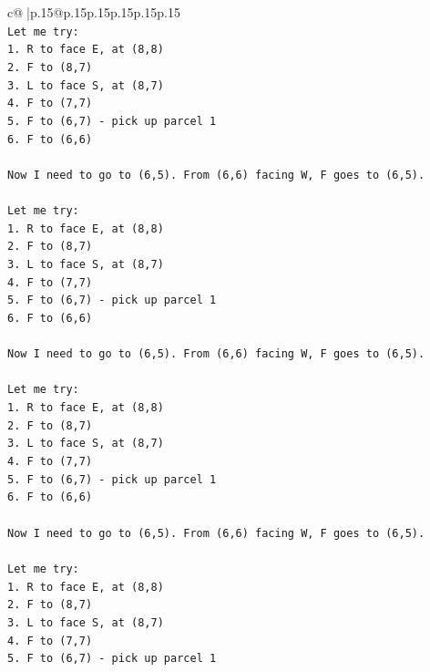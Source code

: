 \documentclass{article}
\begin{document}
{\begin{supertabular}{c@{$\;$}|p{.15\linewidth}@{}p{.15\linewidth}p{.15\linewidth}p{.15\linewidth}p{.15\linewidth}p{.15\linewidth}}
{{{\\ 
\texttt{Let me try:} \\
\texttt{1. R to face E, at (8,8)} \\
\texttt{2. F to (8,7)} \\
\texttt{3. L to face S, at (8,7)} \\
\texttt{4. F to (7,7)} \\
\texttt{5. F to (6,7) {-} pick up parcel 1} \\
\texttt{6. F to (6,6)} \\
\\ 
\texttt{Now I need to go to (6,5). From (6,6) facing W, F goes to (6,5).} \\
\\ 
\texttt{Let me try:} \\
\texttt{1. R to face E, at (8,8)} \\
\texttt{2. F to (8,7)} \\
\texttt{3. L to face S, at (8,7)} \\
\texttt{4. F to (7,7)} \\
\texttt{5. F to (6,7) {-} pick up parcel 1} \\
\texttt{6. F to (6,6)} \\
\\ 
\texttt{Now I need to go to (6,5). From (6,6) facing W, F goes to (6,5).} \\
\\ 
\texttt{Let me try:} \\
\texttt{1. R to face E, at (8,8)} \\
\texttt{2. F to (8,7)} \\
\texttt{3. L to face S, at (8,7)} \\
\texttt{4. F to (7,7)} \\
\texttt{5. F to (6,7) {-} pick up parcel 1} \\
\texttt{6. F to (6,6)} \\
\\ 
\texttt{Now I need to go to (6,5). From (6,6) facing W, F goes to (6,5).} \\
\\ 
\texttt{Let me try:} \\
\texttt{1. R to face E, at (8,8)} \\
\texttt{2. F to (8,7)} \\
\texttt{3. L to face S, at (8,7)} \\
\texttt{4. F to (7,7)} \\
\texttt{5. F to (6,7) {-} pick up parcel 1} \\
}}}
\end{supertabular}}
\end{document}
